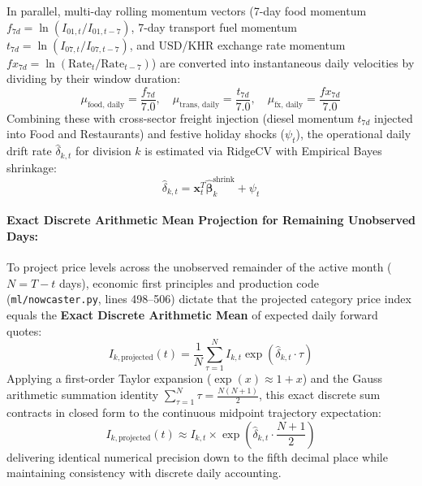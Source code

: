 \hs In parallel, multi-day rolling momentum vectors (7-day food momentum $f_{7d} = \ln(I_{01, t} / I_{01, t-7})$, 7-day transport fuel momentum $t_{7d} = \ln(I_{07, t} / I_{07, t-7})$, and USD/KHR exchange rate momentum $fx_{7d} = \ln(\text{Rate}_t / \text{Rate}_{t-7})$) are converted into instantaneous daily velocities by dividing by their window duration:
\begin{equation}
    \mu_{\text{food, daily}} = \frac{f_{7d}}{7.0}, \quad \mu_{\text{trans, daily}} = \frac{t_{7d}}{7.0}, \quad \mu_{\text{fx, daily}} = \frac{fx_{7d}}{7.0}
\end{equation}
Combining these with cross-sector freight injection (diesel momentum $t_{7d}$ injected into Food and Restaurants) and festive holiday shocks ($\psi_t$), the operational daily drift rate $\hat{\delta}_{k, t}$ for division $k$ is estimated via RidgeCV with Empirical Bayes shrinkage:
\begin{equation}
    \hat{\delta}_{k, t} = \mathbf{x}_t^T \hat{\boldsymbol{\beta}}_k^{\text{shrink}} + \psi_t
\end{equation}

\paragraph{Exact Discrete Arithmetic Mean Projection for Remaining Unobserved Days:}
To project price levels across the unobserved remainder of the active month ($N = T - t$ days), economic first principles and production code (\texttt{ml/nowcaster.py}, lines 498--506) dictate that the projected category price index equals the \textbf{Exact Discrete Arithmetic Mean} of expected daily forward quotes:
\begin{equation}
    \boxed{I_{k, \text{projected}}(t) = \frac{1}{N} \sum_{\tau=1}^N I_{k, t} \exp\left( \hat{\delta}_{k, t} \cdot \tau \right)}
\end{equation}
Applying a first-order Taylor expansion ($\exp(x) \approx 1 + x$) and the Gauss arithmetic summation identity $\sum_{\tau=1}^N \tau = \frac{N(N+1)}{2}$, this exact discrete sum contracts in closed form to the continuous midpoint trajectory expectation:
\begin{equation}
    I_{k, \text{projected}}(t) \approx I_{k, t} \times \exp\left( \hat{\delta}_{k, t} \cdot \frac{N + 1}{2} \right)
\end{equation}
delivering identical numerical precision down to the fifth decimal place while maintaining consistency with discrete daily accounting.

